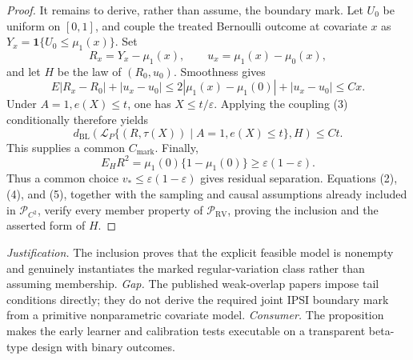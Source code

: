 \documentclass{article}
\begin{document}
\begin{proof}
It remains to derive, rather than assume, the boundary mark.  Let \(U_0\) be uniform on \([0,1]\), and couple the treated Bernoulli outcome at covariate \(x\) as \(Y_x=\mathbf1\{U_0\leq\mu_1(x)\}\).  Set
\[
 R_x=Y_x-\mu_1(x),\qquad u_x=\mu_1(x)-\mu_0(x),
\]
and let \(H\) be the law of \((R_0,u_0)\).  Smoothness gives
\[
 E|R_x-R_0|+|u_x-u_0|
 \leq 2|\mu_1(x)-\mu_1(0)|+|u_x-u_0|\leq Cx. \tag{3}
\]
Under \(A=1,e(X)\leq t\), one has \(X\leq t/\varepsilon\).  Applying the coupling (3) conditionally therefore yields
\[
 d_{\mathrm{BL}}\!\left(\mathcal L_P\{(R,\tau(X))\mid A=1,e(X)\leq t\},H\right)
 \leq Ct. \tag{4}
\]
This supplies a common \(C_{\mathrm{mark}}\).  Finally,
\[
 E_HR^2=\mu_1(0)\{1-\mu_1(0)\}\geq\varepsilon(1-\varepsilon). \tag{5}
\]
Thus a common choice \(v_*\leq\varepsilon(1-\varepsilon)\) gives residual separation.  Equations (2), (4), and (5), together with the sampling and causal assumptions already included in \(\mathcal P_{C^2}\), verify every member property of \(\mathcal P_{\mathrm{RV}}\), proving the inclusion and the asserted form of \(H\).
\end{proof}
\par\smallskip\noindent \textit{Justification.} The inclusion proves that the explicit feasible model is nonempty and genuinely instantiates the marked regular-variation class rather than assuming membership. \textit{Gap.} The published weak-overlap papers impose tail conditions directly; they do not derive the required joint IPSI boundary mark from a primitive nonparametric covariate model. \textit{Consumer.} The proposition makes the early learner and calibration tests executable on a transparent beta-type design with binary outcomes.
\end{document}
